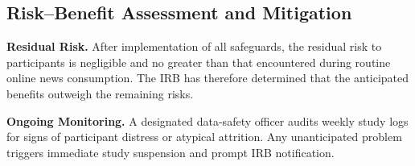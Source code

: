 \documentclass[12pt, american]{article}
\begin{document}
\subsection{Risk–Benefit Assessment and Mitigation}






\textbf{Residual Risk.} 
After implementation of all safeguards, the residual risk to participants is negligible and no greater than that encountered during routine online news consumption.  The IRB has therefore determined that the anticipated benefits outweigh the remaining risks.

\textbf{Ongoing Monitoring.} 
A designated data-safety officer audits weekly study logs for signs of participant distress or atypical attrition.  Any unanticipated problem triggers immediate study suspension and prompt IRB notification.
\end{document}
